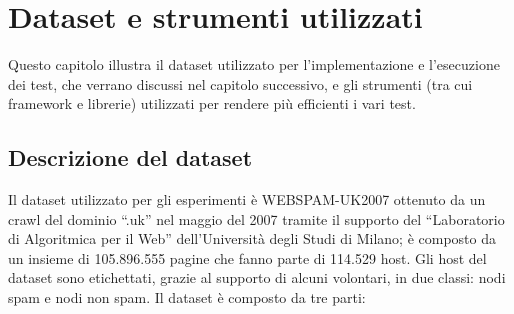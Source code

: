 \chapter{Dataset e strumenti utilizzati}
Questo capitolo illustra il dataset utilizzato per l'implementazione e l'esecuzione dei test,  che verrano discussi nel capitolo successivo, e gli strumenti (tra cui framework e librerie) utilizzati per rendere più efficienti i vari test.
\section{Descrizione del dataset}
Il dataset utilizzato per gli esperimenti è WEBSPAM-UK2007 \cite{webspam-uk2007} ottenuto da un crawl del dominio ``.uk'' nel maggio del 2007 tramite il supporto del ``Laboratorio di Algoritmica per il Web'' dell'Università degli Studi di Milano; è composto da un insieme di 105.896.555 pagine che fanno parte di 114.529 host. Gli host del dataset  sono etichettati,  grazie al supporto  di alcuni volontari,  in due classi: nodi spam e nodi non spam. Il dataset è composto da tre parti:
